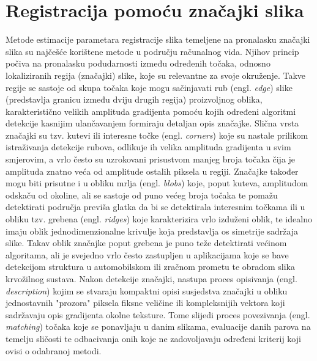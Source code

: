 \documentclass[times, utf8, diplomski]{fer}
\begin{document}
\section{Registracija pomoću značajki slika}
Metode estimacije parametara registracije slika temeljene na pronalasku značajki slika su najčešće korištene metode u području računalnog vida. Njihov princip počiva na pronalasku podudarnosti između određenih točaka, odnosno lokaliziranih regija (značajki) slike, koje su relevantne za svoje  okruženje. Takve regije se sastoje od skupa točaka koje mogu sačinjavati rub (engl. \textit{edge}) slike (predstavlja granicu između dviju drugih regija) proizvoljnog oblika, karakteristično velikih amplituda gradijenta pomoću kojih određeni algoritmi detekcije kasnijim ulančavanjem formiraju detaljan opis značajke. Slična vrsta značajki su tzv. kutevi ili interesne točke (engl. \textit{corners}) koje su nastale prilikom istraživanja detekcije rubova, odlikuje ih velika amplituda gradijenta u svim smjerovim, a vrlo često su uzrokovani prisustvom manjeg broja točaka čija je amplituda znatno veća od amplitude ostalih piksela u regiji. Značajke također mogu biti prisutne i u obliku mrlja (engl. \textit{blobs}) koje, poput kuteva, amplitudom odskaču od okoline, ali se sastoje od puno većeg broja točaka te pomažu detektirati područja previša glatka da bi se detektirala interesnim točkama ili u obliku tzv. grebena (engl. \textit{ridges}) koje karakterizira vrlo izduženi oblik, te idealno imaju oblik jednodimenzionalne krivulje koja predstavlja os simetrije sadržaja slike. Takav oblik značajke poput grebena je puno teže detektirati većinom algoritama, ali je svejedno vrlo često zastupljen u aplikacijama koje se bave detekcijom struktura u automobilskom ili zračnom prometu te obradom slika krvožilnog sustava. Nakon detekcije značajki, nastupa proces opisivanja (engl. \textit{description}) kojim se stvaraju kompaktni opisi susjedstva značajki u obliku jednostavnih "prozora" piksela fiksne veličine ili kompleksnijih vektora koji sadržavaju opis gradijenta okolne teksture. Tome slijedi proces povezivanja (engl. \textit{matching}) točaka koje se ponavljaju u danim slikama, evaluacije danih parova na temelju sličosti te odbacivanja onih koje ne zadovoljavaju određeni kriterij koji ovisi o odabranoj metodi. 
\end{document}
